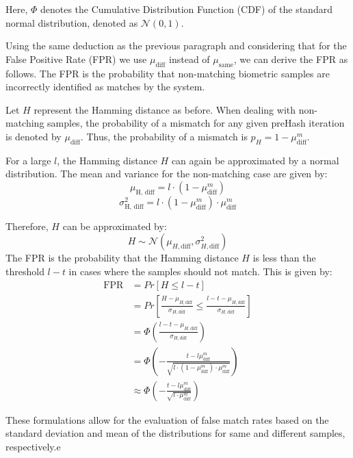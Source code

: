 Here, \(\Phi\) denotes the Cumulative Distribution Function (CDF) of the standard normal distribution, denoted as \(\mathcal{N}(0, 1)\).

Using the same deduction as the previous paragraph and considering that for the False Positive Rate (FPR) we use \(\mu_{\text{diff}}\) instead of \(\mu_{\text{same}}\), we can derive the FPR as follows. The FPR is the probability that non-matching biometric samples are incorrectly identified as matches by the system. 

Let \( H \) represent the Hamming distance as before. When dealing with non-matching samples, the probability of a mismatch for any given preHash iteration is denoted by \( \mu_{\text{diff}} \). Thus, the probability of a mismatch is \( p_H = 1 - \mu_{\text{diff}}^m \).

For a large \( l \), the Hamming distance \( H \) can again be approximated by a normal distribution. The mean and variance for the non-matching case are given by:
\[
\mu_{\text{H, diff}} = l \cdot (1 - \mu_{\text{diff}}^m)
\]
\[
\sigma_{\text{H, diff}}^2 = l \cdot (1 - \mu_{\text{diff}}^m) \cdot \mu_{\text{diff}}^m
\]

Therefore, \( H \) can be approximated by:
\[
H \sim \mathcal{N}(\mu_{H, \text{diff}}, \sigma_{H, \text{diff}}^2)
\]
\newpage
The FPR is the probability that the Hamming distance \( H \) is less than the threshold \( l - t \) in cases where the samples should not match. This is given by:
\begin{equation}
\begin{aligned}
    \label{eq:fpr}
    \text{FPR} &= Pr[H \leq l - t] \\
    &= Pr\left[\frac{H - \mu_{H, \text{diff}}}{\sigma_{H, \text{diff}}} \leq \frac{l - t - \mu_{H, \text{diff}}}{\sigma_{H, \text{diff}}}\right] \\
    &= \Phi\left(\frac{l - t - \mu_{H, \text{diff}}}{\sigma_{H, \text{diff}}}\right) \\
    &= \Phi\left(-\frac{t - l\mu_{\text{diff}}^m}{\sqrt{l \cdot (1 - \mu_{\text{diff}}^m) \cdot \mu_{\text{diff}}^m}}\right)\\
    &\approx\Phi\left(-\frac{t - l\mu_{\text{diff}}^m}{\sqrt{l\cdot \mu_{\text{diff}}^m}}\right)
\end{aligned}
\end{equation}

These formulations allow for the evaluation of false match rates based on the standard deviation and mean of the distributions for same and different samples, respectively.e

